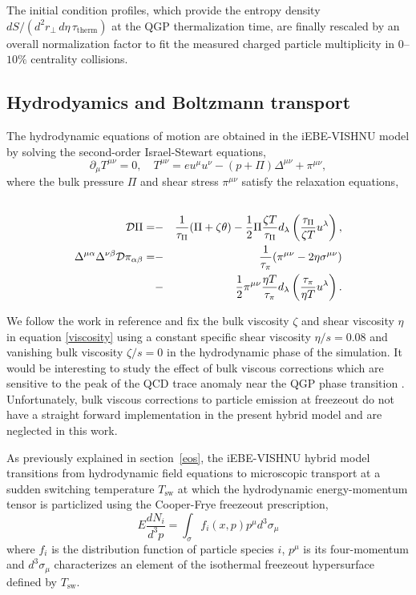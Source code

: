 \documentclass[aps,prc,reprint,amsmath,nofootinbib,superscriptaddress]{revtex4-1}
\begin{document}
The initial condition profiles, which provide the entropy density $dS/(d^2r_\perp\, d\eta\, \tau_\text{therm})$ at the QGP thermalization time, are finally 
rescaled by an overall normalization factor to fit the measured charged particle multiplicity in $0$--$10\%$ centrality collisions.

\subsection{Hydrodyamics and Boltzmann transport}

The hydrodynamic equations of motion are obtained in the iEBE-VISHNU model by solving the second-order Israel-Stewart equations,
\begin{equation}
 \partial_\mu T^{\mu\nu} = 0, \quad T^{\mu\nu} = e u^\mu u^\nu - (p + \Pi) \Delta^{\mu\nu} + \pi^{\mu\nu},
\end{equation}
where the bulk pressure $\Pi$ and shear stress $\pi^{\mu\nu}$ satisfy the relaxation equations,
\begin{eqnarray}
 \label{viscosity}
 \cr \mathcal{D}\Pi = &-&\frac{1}{\tau_\Pi}(\Pi + \zeta \theta) - \frac{1}{2} \Pi \frac{\zeta T}{\tau_\Pi}d_\lambda \left(\frac{\tau_\Pi}{\zeta T} u^\lambda \right), \nonumber \\
  \Delta^{\mu\alpha} \Delta^{\nu\beta} \mathcal{D}\pi_{\alpha\beta} = &-&\frac{1}{\tau_\pi}(\pi^{\mu\nu} - 2 \eta \sigma^{\mu\nu}) \\
  &-& \frac{1}{2} \pi^{\mu\nu} \frac{\eta T}{\tau_\pi} d_\lambda\left(\frac{\tau_\pi}{\eta T} u^\lambda \right ).
\end{eqnarray}

We follow the work in reference \cite{Shen:2014sfi} and fix the bulk viscosity $\zeta$ and shear viscosity $\eta$ in equation \eqref{viscosity} using a constant specific shear viscosity $\eta/s=0.08$ 
and vanishing bulk viscosity $\zeta/s=0$ in the hydrodynamic phase of the simulation. It would be interesting to study the effect of bulk viscous corrections which are sensitive to 
the peak of the QCD trace anomaly near the QGP phase transition \cite{Karsch:2007jc}. Unfortunately, bulk viscous corrections to particle emission at freezeout do not have a straight forward implementation in the present hybrid model 
and are neglected in this work. 

As previously explained in section \,\ref{eos}, the iEBE-VISHNU hybrid model transitions from hydrodynamic field equations to microscopic transport at a sudden switching temperature $T_\text{sw}$ 
at which the hydrodynamic energy-momentum tensor is particlized using the Cooper-Frye freezeout prescription,
\begin{equation}
 E\frac{dN_i}{d^3p} = \int_\sigma f_i(x,p) p^\mu d^3\sigma_\mu
 \label{cooper-frye}
\end{equation}
where $f_i$ is the distribution function of particle species $i$, $p^\mu$ is its four-momentum and $d^3\sigma_\mu$ characterizes an element of the isothermal freezeout 
hypersurface defined by $T_\text{sw}$.
\end{document}
